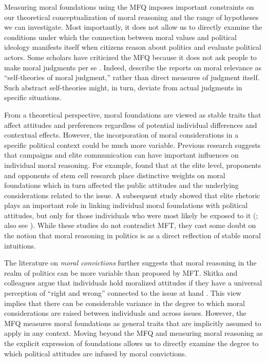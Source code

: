 \documentclass[12pt]{article}
\begin{document}
Measuring moral foundations using the MFQ imposes important constraints on our theoretical conceptualization of moral reasoning and the range of hypotheses we can investigate. Most importantly, it does not allow us to directly examine the conditions under which the connection between moral values and political ideology manifests itself when citizens reason about politics and evaluate political actors. Some scholars have criticized the MFQ because it does not ask people to make moral judgments per se \citep[e.g.][]{clifford2015moral}. Indeed, \citet[1031]{graham2009liberals} describe the reports on moral relevance as ``self-theories of moral judgment,'' rather than direct measures of judgment itself. Such abstract self-theories might, in turn, deviate from actual judgments in specific situations.

From a theoretical perspective, moral foundations are viewed as stable traits that affect attitudes and preferences regardless of potential individual differences and contextual effects. However, the incorporation of moral considerations in a specific political context could be much more variable. Previous research suggests that campaigns and elite communication can have important influences on individual moral reasoning. For example, \citet{clifford2013words} found that at the elite level, proponents and opponents of stem cell research place distinctive weights on moral foundations which in turn affected the public attitudes and the underlying considerations related to the issue. A subsequent study showed that elite rhetoric plays an important role in linking individual moral foundations with political attitudes, but only for those individuals who were most likely be exposed to it (\citealt{clifford2015concerns}; also see \citealt{day2014shifting}). While these studies do not contradict MFT, they cast some doubt on the notion that moral reasoning in politics is as a direct reflection of stable moral intuitions. 

The literature on \textit{moral convictions} further suggests that moral reasoning in the realm of politics can be more variable than proposed by MFT. Skitka and colleagues argue that individuals hold moralized attitudes if they have a universal perception of ``right and wrong'' connected to the issue at hand \citep{skitka2005moral,mullen2006exploring,skitka2010psychology}. This view implies that there can be considerable variance in the degree to which moral considerations are raised between individuals and across issues. However, the MFQ measures moral foundations as general traits that are implicitly assumed to apply in any context. Moving beyond the MFQ and measuring moral reasoning as the explicit expression of foundations allows us to directly examine the degree to which political attitudes are infused by moral convictions.
\end{document}
